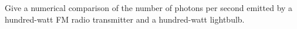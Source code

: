 Give a numerical comparison of the number of photons per second emitted
by a hundred-watt FM radio transmitter and a hundred-watt lightbulb.\answercheck

